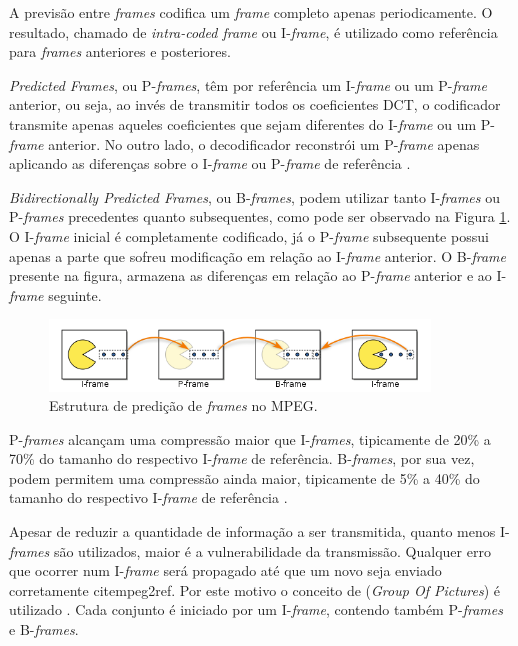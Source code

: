 A previsão entre \emph{frames} codifica um \emph{frame} completo apenas periodicamente. O resultado, chamado de \emph{intra-coded frame} ou I-\emph{frame}, é utilizado como referência para \emph{frames} anteriores e posteriores.

\emph{Predicted Frames}, ou P-\emph{frames}, têm por referência um I-\emph{frame} ou um P-\emph{frame} anterior, ou seja, ao invés de transmitir todos os coeficientes DCT, o codificador transmite apenas aqueles coeficientes que sejam diferentes do I-\emph{frame} ou um P-\emph{frame} anterior. No outro lado, o decodificador reconstrói um P-\emph{frame} apenas aplicando as diferenças sobre o I-\emph{frame} ou P-\emph{frame} de referência \cite{mpeg2ref}.

\emph{Bidirectionally Predicted Frames}, ou B-\emph{frames}, podem utilizar tanto I-\emph{frames} ou P-\emph{frames} precedentes quanto subsequentes, como pode ser observado na Figura \ref{fig:ipbframes}. O I-\emph{frame} inicial é completamente codificado, já o P-\emph{frame} subsequente possui apenas a parte que sofreu modificação em relação ao I-\emph{frame} anterior. O B-\emph{frame} presente na figura, armazena as diferenças em relação ao P-\emph{frame} anterior e ao I-\emph{frame} seguinte.

\begin{figure}[!htb]
	\centering
	\includegraphics[width=0.9\textwidth]{./imgs/ipbframes.png}
	\caption{Estrutura de predição de \emph{frames} no MPEG.}
	\label{fig:ipbframes}
\end{figure}

P-\emph{frames} alcançam uma compressão maior que I-\emph{frames}, tipicamente de 20\% a 70\% do tamanho do respectivo I-\emph{frame} de referência. B-\emph{frames}, por sua vez, podem permitem uma compressão ainda maior, tipicamente de 5\% a 40\% do tamanho do respectivo I-\emph{frame} de referência \cite{ciscoieee}.

Apesar de reduzir a quantidade de informação a ser transmitida, quanto menos I-\emph{frames} são utilizados, maior é a vulnerabilidade da transmissão. Qualquer erro que ocorrer num I-\emph{frame} será propagado até que um novo seja enviado corretamente  cite{mpeg2ref}. Por este motivo o conceito de  (\emph{Group Of Pictures}) é utilizado \cite{mpeg2ref}. Cada conjunto é iniciado por um I-\emph{frame}, contendo também P-\emph{frames} e B-\emph{frames}.

